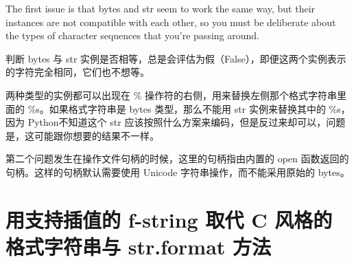The first issue is that bytes and str seem to work the same way, but their instances are not compatible with each other, so you must be deliberate about the types of character sequences that you’re passing around.

判断 bytes 与 str 实例是否相等，总是会评估为假（False），即便这两个实例表示的字符完全相同，它们也不想等。

两种类型的实例都可以出现在 \% 操作符的右侧，用来替换左侧那个格式字符串里面的 \%s。如果格式字符串是 bytes 类型，那么不能用 str 实例来替换其中的 \%s，因为 Python不知道这个 str 应该按照什么方案来编码，但是反过来却可以，问题是，这可能跟你想要的结果不一样。


第二个问题发生在操作文件句柄的时候，这里的句柄指由内置的 open 函数返回的句柄。这样的句柄默认需要使用 Unicode 字符串操作，而不能采用原始的 bytes。
\section{用支持插值的 f-string 取代 C 风格的格式字符串与 str.format 方法}